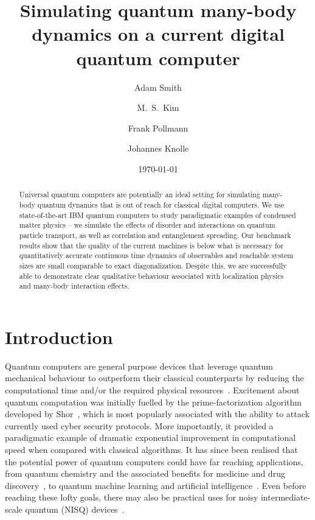 \documentclass[twocolumn,showpacs,preprintnumbers,nofootinbib,amsmath,aps,pra,longbibliography,amssymb,superscriptaddress]{revtex4-1}
\begin{document}
\title{Simulating quantum many-body dynamics on a current digital quantum computer}
\author{Adam Smith}
\author{M.~S.~Kim}
\author{Frank Pollmann}
\author{Johannes Knolle}
\date{\today}


\begin{abstract}
	Universal quantum computers are potentially an ideal setting for simulating many-body quantum dynamics that is out of reach for classical digital computers. We use state-of-the-art IBM quantum computers to study paradigmatic examples of condensed matter physics -- we simulate the effects of disorder and interactions on quantum particle transport, as well as correlation and entanglement spreading. Our benchmark results show that the quality of the current machines is below what is necessary for quantitatively accurate continuous time dynamics of observables and reachable system sizes are small comparable to exact diagonalization. Despite this, we are successfully able to demonstrate clear qualitative behaviour associated with localization physics and many-body interaction effects. 
\end{abstract}

\maketitle



\section*{Introduction}

Quantum computers are general purpose devices that leverage quantum mechanical behaviour to outperform their classical counterparts by reducing the computational time and/or the required physical resources~\cite{Nielsen2010}. Excitement about quantum computation was initially fuelled by the prime-factorization algorithm developed by Shor~\cite{Shor1995}, which is most popularly associated with the ability to attack currently used cyber security protocols. More importantly, it provided a paradigmatic example of dramatic exponential improvement in computational speed when compared with classical algorithms. It has since been realised that the potential power of quantum computers could have far reaching applications, from quantum chemistry and the associated benefits for medicine and drug discovery~\cite{Kandala2017}, to quantum machine learning and artificial intelligence~\cite{Biamonte2017}. Even before reaching these lofty goals, there may also be practical uses for noisy intermediate-scale quantum (NISQ) devices~\cite{Preskill2018}.
\end{document}
